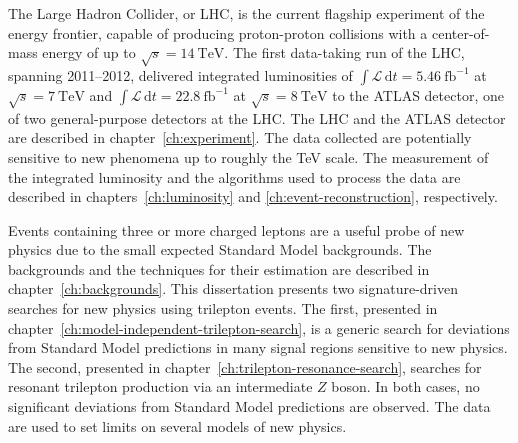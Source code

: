 The Large Hadron Collider, or LHC, is the current flagship experiment of the energy frontier, capable of producing proton-proton collisions with a center-of-mass energy of up to $\sqrt{s}=\SI{14}{\tera\electronvolt}$. The first data-taking run of the LHC, spanning 2011--2012, delivered integrated luminosities of $\int \mathcal{L}\, \mathrm{d}t=\SI{5.46}{\femto\barn\tothe{-1}}$ at $\sqrt{s}=\SI{7}{\tera\electronvolt}$ and $\int \mathcal{L}\, \mathrm{d}t=\SI{22.8}{\femto\barn\tothe{-1}}$ at $\sqrt{s}=\SI{8}{\tera\electronvolt}$ to the ATLAS detector, one of two general-purpose detectors at the LHC. The LHC and the ATLAS detector are described in chapter~\ref{ch:experiment}. The data collected are potentially sensitive to new phenomena up to roughly the TeV scale. The measurement of the integrated luminosity and the algorithms used to process the data are described in chapters~\ref{ch:luminosity} and \ref{ch:event-reconstruction}, respectively.

Events containing three or more charged leptons are a useful probe of new physics due to the small expected Standard Model backgrounds. The backgrounds and the techniques for their estimation are described in chapter~\ref{ch:backgrounds}.  This dissertation presents two signature-driven searches for new physics using trilepton events. The first, presented in chapter~\ref{ch:model-independent-trilepton-search}, is a generic search for deviations from Standard Model predictions in many signal regions sensitive to new physics. The second, presented in chapter~\ref{ch:trilepton-resonance-search}, searches for resonant trilepton production via an intermediate $Z$ boson. In both cases, no significant deviations from Standard Model predictions are observed. The data are used to set limits on several models of new physics. 
